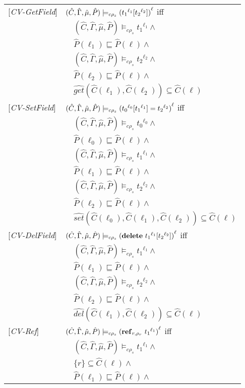 \documentclass[[12pt,a4paper,twoside,openrigh]{article}
\newcommand{\Cat}[0]{\hat{C}}
\newcommand{\muat}[0]{\hat{\mu}}
\newcommand{\Env}[0]{\hat{\Gamma}}
\newcommand{\Pat}[0]{\hat{P}}
\newcommand{\cenvs}{(\Cat,\Env,\muat,\Pat)}
\newcommand{\ccest}[1]{\cenvs \models_{c \rho_s} #1}
\newcommand{\ccestl}[1]{\cenvs \models_{c \rho_s} {(#1)}^{\ell}}
\newcommand{\lbt}[1]{{t_#1}^{\ell_#1}}
\begin{document}
\begin{tabular} {l l l l}
{[\textit{CV-GetField}]}&\multicolumn{3}{l}{$\ccestl {\lookup {\lbt 1} {\lbt 2}} $ iff}\\
&&\multicolumn{2}{l}{$ \ccest {\lbt1} \wedge $}\\
&&\multicolumn{2}{l}{$\Pat(\ell_1) \sqsubseteq \Pat(\ell) \wedge$} \\
&&\multicolumn{2}{l}{$ \ccest {\lbt 2} \wedge $} \\
&&\multicolumn{2}{l}{$\Pat(\ell_2) \sqsubseteq \Pat(\ell) \wedge$} \\
&&\multicolumn{2}{l}{$\widehat{get} (\Cat(\ell_1), \Cat(\ell_2)) \subseteq \Cat(\ell)$} \\
{[\textit{CV-SetField}]}&\multicolumn{3}{l}{$\ccestl {\store {\lbt 0} {\lbt 1} {\lbt 2}} $ iff}\\
&&\multicolumn{2}{l}{$ \ccest {\lbt 0} \wedge $}\\
&&\multicolumn{2}{l}{$\Pat(\ell_0) \sqsubseteq \Pat(\ell) \wedge$} \\
&&\multicolumn{2}{l}{$ \ccest {\lbt 1} \wedge $} \\
&&\multicolumn{2}{l}{$\Pat(\ell_1) \sqsubseteq \Pat(\ell) \wedge$} \\
&&\multicolumn{2}{l}{$ \ccest {\lbt 2} \wedge $} \\
&&\multicolumn{2}{l}{$\Pat(\ell_2) \sqsubseteq \Pat(\ell) \wedge$} \\
&&\multicolumn{2}{l}{$\widehat{set} (\Cat(\ell_0), \Cat(\ell_1), \Cat(\ell_2)) \subseteq \Cat(\ell)$} \\
{[\textit{CV-DelField}]}&\multicolumn{3}{l}{$\ccestl {\delete {\lbt 1} {\lbt 2}} $ iff}\\ 
&&\multicolumn{2}{l}{$ \ccest {\lbt 1} \wedge $}\\
&&\multicolumn{2}{l}{$\Pat(\ell_1) \sqsubseteq \Pat(\ell) \wedge$} \\
&&\multicolumn{2}{l}{$ \ccest {\lbt 2} \wedge $} \\
&&\multicolumn{2}{l}{$\Pat(\ell_2) \sqsubseteq \Pat(\ell) \wedge$} \\
&&\multicolumn{2}{l}{$\widehat{del} (\Cat(\ell_1), \Cat(\ell_2)) \subseteq \Cat(\ell)$}\\
{[\textit{CV-Ref}]}&\multicolumn{3}{l}{$ \ccestl {\newref {r,\rho_r} {\lbt 1}} $ iff}\\
&&\multicolumn{2}{l}{$\ccest {\lbt 1} \wedge $}\\
&&\multicolumn{2}{l}{$\{r\} \subseteq \Cat(\ell) \wedge$}\\
&&\multicolumn{2}{l}{$\Pat(\ell_1) \sqsubseteq \Pat(\ell) \wedge$}\\

\end{tabular}
\end{document}

